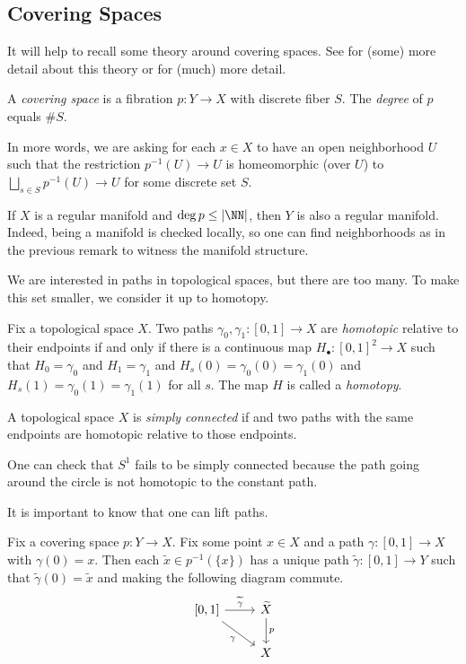 \documentclass[../notes.tex]{subfiles}
\begin{document}
\subsection{Covering Spaces}
It will help to recall some theory around covering spaces. See \cite{elber-alg-top} for (some) more detail about this theory or \cite{hatcher} for (much) more detail.
\begin{definition}
	A \textit{covering space} is a fibration $p\colon Y\to X$ with discrete fiber $S$. The \textit{degree} of $p$ equals $\#S$.
\end{definition}
In more words, we are asking for each $x\in X$ to have an open neighborhood $U$ such that the restriction $p^{-1}(U)\to U$ is homeomorphic (over $U$) to $\bigsqcup_{s\in S}p^{-1}(U)\to U$ for some discrete set $S$.
\begin{remark} \label{rem:covering-manifold}
	If $X$ is a regular manifold and $\deg p\le\left|\NN\right|$, then $Y$ is also a regular manifold. Indeed, being a manifold is checked locally, so one can find neighborhoods as in the previous remark to witness the manifold structure.
\end{remark}
We are interested in paths in topological spaces, but there are too many. To make this set smaller, we consider it up to homotopy.
\begin{definition}[homotopy]
	Fix a topological space $X$. Two paths $\gamma_0,\gamma_1\colon[0,1]\to X$ are \textit{homotopic} relative to their endpoints if and only if there is a continuous map $H_\bullet\colon[0,1]^2\to X$ such that $H_0=\gamma_0$ and $H_1=\gamma_1$ and $H_s(0)=\gamma_0(0)=\gamma_1(0)$ and $H_s(1)=\gamma_0(1)=\gamma_1(1)$ for all $s$. The map $H$ is called a \textit{homotopy}.
\end{definition}
\begin{definition}
	A topological space $X$ is \textit{simply connected} if and two paths with the same endpoints are homotopic relative to those endpoints.
\end{definition}
\begin{example}
	One can check that $S^1$ fails to be simply connected because the path going around the circle is not homotopic to the constant path.
\end{example}
It is important to know that one can lift paths.
\begin{theorem}
	Fix a covering space $p\colon Y\to X$. Fix some point $x\in X$ and a path $\gamma\colon[0,1]\to X$ with $\gamma(0)=x$. Then each $\widetilde x\in p^{-1}(\{x\})$ has a unique path $\widetilde\gamma\colon[0,1]\to Y$ such that $\widetilde\gamma(0)=\widetilde x$ and making the following diagram commute.
	\[\begin{tikzcd}
		{[0,1]} & {\widetilde X} \\
		& X
		\arrow["{\widetilde\gamma}", from=1-1, to=1-2]
		\arrow["\gamma"', from=1-1, to=2-2]
		\arrow["p", from=1-2, to=2-2]
	\end{tikzcd}\]
\end{theorem}
\end{document}
